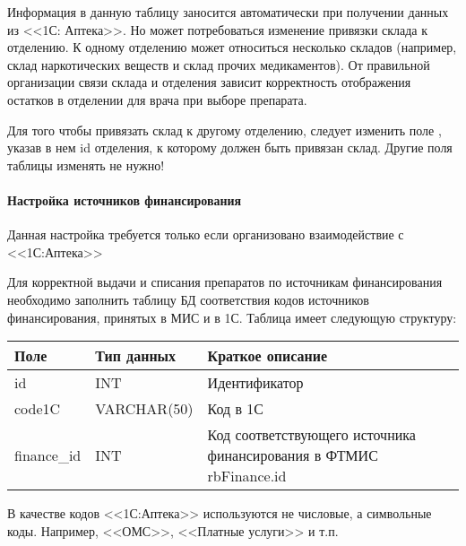 Информация в данную таблицу заносится автоматически при получении данных из <<1С: Аптека>>. Но может потребоваться изменение привязки склада к отделению. К одному отделению может относиться несколько складов (например, склад наркотических веществ и склад прочих медикаментов). От правильной организации связи склада и отделения зависит корректность отображения остатков в отделении для врача при выборе препарата.

Для того чтобы привязать склад к другому отделению, следует изменить поле  , указав в нем id отделения, к которому должен быть привязан склад. Другие поля таблицы изменять не нужно!

\paragraph{Настройка источников финансирования}  

\begin{vnim}
Данная настройка требуется только если организовано взаимодействие с <<1С:Аптека>>
\end{vnim}

Для корректной выдачи и списания препаратов по источникам финансирования необходимо заполнить таблицу БД  соответствия кодов источников финансирования, принятых в МИС и в 1С. Таблица имеет следующую структуру:

\begin{table}
\small
{} \label{tbl_oth_rbfin1c} 
 \begin{tabular}{|p{4cm}|p{4cm}|p{8.7cm}|}
  \hline \rule{0pt}{15pt} \centering \textbf{Поле} & \centering \textbf{Тип данных} & \hfil \textbf{Краткое описание} \\ \hline
  id &	INT &	Идентификатор  \\ \hline
  code1C	& VARCHAR(50) &	Код в 1С \\ \hline
  finance\_id	& INT	& Код соответствующего источника финансирования в ФТМИС {rbFinance.id} \\ \hline
 \end{tabular}
\end{table}

\begin{vnim}
 В качестве кодов <<1С:Аптека>> используются не числовые, а символьные коды. Например, <<ОМС>>, <<Платные услуги>> и т.п.
\end{vnim} 